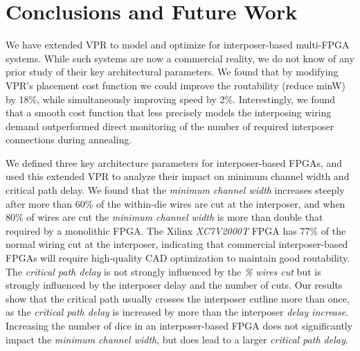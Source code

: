 \documentclass{sig-alternate-2013}
\begin{document}
\section{Conclusions and Future Work}
\label{conclusionSection}

We have extended VPR to model and optimize for interposer-based multi-FPGA systems. While such systems are now a commercial reality, we do not know of any prior study of their key architectural parameters. We found that by modifying VPR's placement cost function we could improve the routability (reduce minW) by 18\%, while simultaneously improving speed by 2\%. Interestingly, we found that a smooth cost function that less precisely models the interposing wiring demand outperformed direct monitoring of the number of required interposer connections during annealing.

We defined three key architecture parameters for interposer-based FPGAs, and used this extended VPR to analyze their impact on minimum channel width and critical path delay. We found that the \textit{minimum channel width} increases steeply after more than 60\% of the within-die wires are cut at the interposer, and when 80\% of wires are cut the \textit{minimum channel width} is more than double that required by a monolithic FPGA. The Xilinx \textit{XC7V2000T} FPGA has 77\% of the normal wiring cut at the interposer, indicating that commercial interposer-based FPGAs will require high-quality CAD optimization to maintain good routability. The \textit{critical path delay} is not strongly influenced by the \textit{\% wires cut} but is strongly influenced by the interposer delay and the number of cuts. Our results show that the critical path usually crosses the interposer cutline more than once, as the \textit{critical path delay} is increased by more than the interposer \textit{delay increase}. Increasing the number of dice in an interposer-based FPGA does not significantly impact the \textit{minimum channel width}, but does lead to a larger \textit{critical path delay}.
\end{document}
